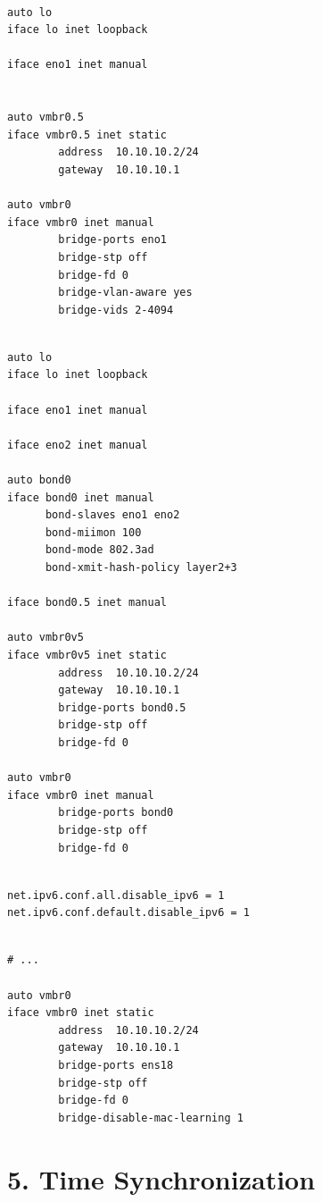 \begin{lstlisting}

auto lo
iface lo inet loopback

iface eno1 inet manual


auto vmbr0.5
iface vmbr0.5 inet static
        address  10.10.10.2/24
        gateway  10.10.10.1

auto vmbr0
iface vmbr0 inet manual
        bridge-ports eno1
        bridge-stp off
        bridge-fd 0
        bridge-vlan-aware yes
        bridge-vids 2-4094

\end{lstlisting}

\begin{lstlisting}

auto lo
iface lo inet loopback

iface eno1 inet manual

iface eno2 inet manual

auto bond0
iface bond0 inet manual
      bond-slaves eno1 eno2
      bond-miimon 100
      bond-mode 802.3ad
      bond-xmit-hash-policy layer2+3

iface bond0.5 inet manual

auto vmbr0v5
iface vmbr0v5 inet static
        address  10.10.10.2/24
        gateway  10.10.10.1
        bridge-ports bond0.5
        bridge-stp off
        bridge-fd 0

auto vmbr0
iface vmbr0 inet manual
        bridge-ports bond0
        bridge-stp off
        bridge-fd 0

\end{lstlisting}

\begin{lstlisting}

net.ipv6.conf.all.disable_ipv6 = 1
net.ipv6.conf.default.disable_ipv6 = 1

\end{lstlisting}

\begin{lstlisting}

# ...

auto vmbr0
iface vmbr0 inet static
        address  10.10.10.2/24
        gateway  10.10.10.1
        bridge-ports ens18
        bridge-stp off
        bridge-fd 0
        bridge-disable-mac-learning 1

\end{lstlisting}


\section{5. Time Synchronization}


